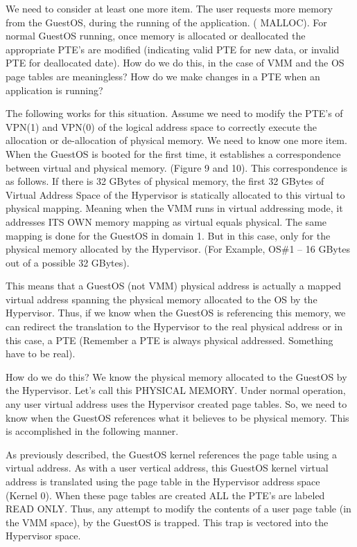 \documentclass{article}
\begin{document}
We need to consider at least one more item.  The user requests more memory from the GuestOS, during the running of the application. ( MALLOC).  For normal GuestOS running,  once memory is allocated or deallocated the appropriate PTE’s are modified (indicating valid PTE for new data, or invalid PTE for deallocated date). How do we do this, in the case of VMM and the OS page tables are meaningless?   How do we make changes in a PTE when an application is running?

The following works for this situation.  Assume we need to modify the PTE’s of VPN(1) and VPN(0) of the logical address space  to correctly execute the allocation or de-allocation of physical memory. We need to know one more item.  When the GuestOS is booted for the first time,  it establishes a correspondence  between virtual and physical memory. (Figure 9 and 10). This correspondence is as follows.  If there is 32 GBytes of physical memory,  the first 32 GBytes of Virtual Address Space of the Hypervisor is statically allocated  to this virtual to physical  mapping. Meaning when the VMM runs in virtual addressing mode,  it addresses ITS OWN memory mapping as virtual equals physical.  The same mapping is done for the GuestOS in domain 1.  But in this case, only for the physical memory allocated by the Hypervisor. (For Example, OS\#1 – 16 GBytes out of a possible 32 GBytes).

This means that a GuestOS (not VMM) physical address is actually a mapped virtual address spanning the physical memory allocated to the OS by the Hypervisor.  Thus, if we know when the GuestOS is referencing this memory,  we can redirect the translation  to the Hypervisor  to the real physical address or in this case, a PTE (Remember a PTE is always physical addressed.  Something have to be real).  

How do we do this?  We know the physical memory allocated to the GuestOS by the Hypervisor.  Let’s call this PHYSICAL MEMORY.   Under normal operation,  any user virtual address uses the Hypervisor created page tables.  So, we need to know when the GuestOS  references what it believes to be physical memory.   This is  accomplished in the following manner. 

As previously described,  the GuestOS kernel references the page table using a virtual address.  As with a user vertical address,  this GuestOS kernel virtual address is translated using the page table in the Hypervisor address space (Kernel 0).  When these page tables are created ALL the PTE’s are labeled READ ONLY.  Thus, any attempt to modify the contents of a user page table (in the VMM space),  by the GuestOS is trapped.  This trap is vectored into the Hypervisor space.
\end{document}
